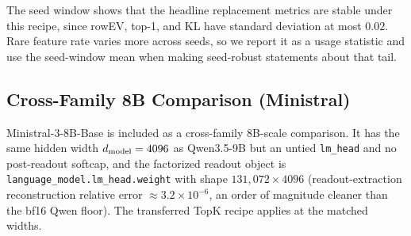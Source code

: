 The seed window shows that the headline replacement metrics are stable under
this recipe, since rowEV, top-1, and KL have standard deviation at most $0.02$. Rare
feature rate varies more across seeds, so we report it as a usage statistic and
use the seed-window mean when making seed-robust statements about that tail.

\ReadoutSAEFloatBarrier
\subsection{Cross-Family 8B Comparison (Ministral)}
\label{app:readout-factorizer-ministral-comparison}

Ministral-3-8B-Base is included as a cross-family 8B-scale comparison. It has the
same hidden width $d_{\mathrm{model}}=4096$ as Qwen3.5-9B but an untied
\texttt{lm\_head} and no post-readout softcap, and the factorized readout object
is \texttt{language\_model.lm\_head.weight} with shape
$131{,}072\times4096$ (readout-extraction
reconstruction relative error $\approx 3.2{\times}10^{-6}$, an order of magnitude
cleaner than the bf16 Qwen floor). The transferred TopK recipe applies
at the matched widths.

